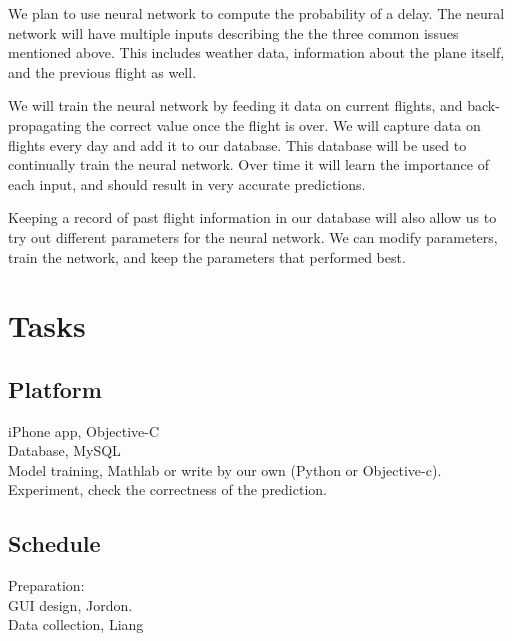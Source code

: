 \documentclass[12pt]{article}
\begin{document}

We plan to use neural network to compute the probability of a delay. The neural
network will have multiple inputs describing the the three common issues
mentioned above. This includes weather data, information about the plane itself,
and the previous flight as well. 

We will train the neural network by feeding it data on current flights,
and back-propagating the correct value once the flight is over. We will capture
data on flights every day and add it to our database. This database will be used
to continually train the neural network. Over time it will learn the importance 
of each input, and should result in very accurate predictions.

Keeping a record of past flight information in our database will also allow us
to try out different parameters for the neural network. We can modify parameters,
train the network, and keep the parameters that performed best.

\section{Tasks}


\subsection{Platform}
iPhone app, Objective-C\\
Database, MySQL\\
Model training, Mathlab or write by our own (Python or Objective-c).\\
Experiment, check the correctness of the prediction.\\

\subsection{Schedule}
Preparation: \\
    GUI design, Jordon. \\
    Data collection, Liang
\end{document}
